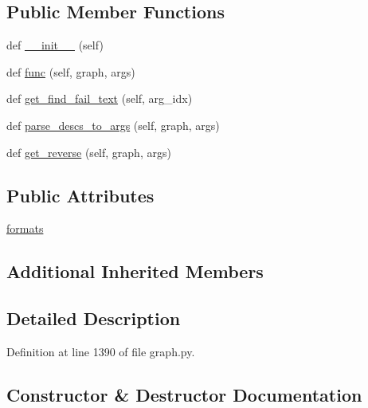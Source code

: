 \subsection*{Public Member Functions}
\begin{DoxyCompactItemize}
\item 
def \hyperlink{classlight__chats_1_1graph_1_1DropObjectFunction_a1afdc7d60d392a4c64764acbd130c13e}{\+\_\+\+\_\+init\+\_\+\+\_\+} (self)
\item 
def \hyperlink{classlight__chats_1_1graph_1_1DropObjectFunction_a2df3dbdd3032d47143978e645d12e928}{func} (self, graph, args)
\item 
def \hyperlink{classlight__chats_1_1graph_1_1DropObjectFunction_a8b23f2a71c27f14580a978f1b07e0471}{get\+\_\+find\+\_\+fail\+\_\+text} (self, arg\+\_\+idx)
\item 
def \hyperlink{classlight__chats_1_1graph_1_1DropObjectFunction_abd2a91a5d3fd3acb95c37fafed688aa0}{parse\+\_\+descs\+\_\+to\+\_\+args} (self, graph, args)
\item 
def \hyperlink{classlight__chats_1_1graph_1_1DropObjectFunction_a6708badf2a02ba13bcf40b0a01caaf37}{get\+\_\+reverse} (self, graph, args)
\end{DoxyCompactItemize}
\subsection*{Public Attributes}
\begin{DoxyCompactItemize}
\item 
\hyperlink{classlight__chats_1_1graph_1_1DropObjectFunction_a48f4d8c91a80deffb09e8a86c7f51e82}{formats}
\end{DoxyCompactItemize}
\subsection*{Additional Inherited Members}


\subsection{Detailed Description}
\begin{DoxyVerb}
\end{DoxyVerb}
 

Definition at line 1390 of file graph.\+py.



\subsection{Constructor \& Destructor Documentation}
\mbox{\label{classlight__chats_1_1graph_1_1DropObjectFunction_a1afdc7d60d392a4c64764acbd130c13e}} 

